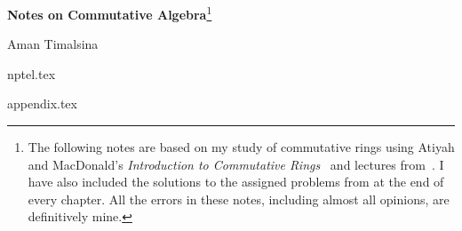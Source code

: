 \documentclass[a4paper]{report}
\begin{document}
\begin{titlepage}
    \begin{center}
        \vspace*{1cm}
            
        \Huge
        \textbf{Notes on Commutative Algebra}\footnote{The following notes are based on my study of commutative rings using Atiyah and MacDonald's {\it Introduction to Commutative Rings}~\citep{atiyah2018introduction} and lectures from~\citep{commalgebra2021}. I have also included the solutions to the assigned problems from \citep{commalgebra2021} at the end of every chapter. All the errors in these notes, including almost all opinions, are definitively mine.}
            
        \vspace{0.5cm}
        \Large
        Aman Timalsina
    \end{center}
\end{titlepage}

{\let\clearpage\relax \tableofcontents}

\setlength\parindent{0pt}

{nptel.tex}

\newpage



\newpage

{appendix.tex}
\end{document}

